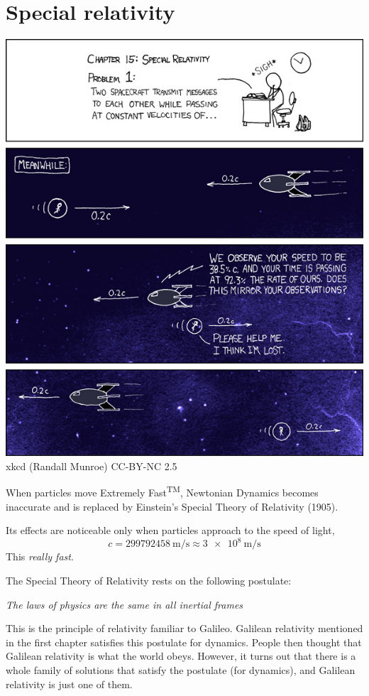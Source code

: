 \documentclass[a4paper]{article}
\begin{document}
\section{Special relativity}
\begin{center}
  \includegraphics[scale=4]{images/xkcd_choices_part_2.jpg}\\
  xkcd (Randall Munroe) CC-BY-NC 2.5
\end{center}
When particles move Extremely Fast\textsuperscript{TM}, Newtonian Dynamics becomes inaccurate and is replaced by Einstein's Special Theory of Relativity (1905).

Its effects are noticeable only when particles approach to the speed of light,
\[
  c = \SI{299792458}{\meter\per\second} \approx \SI{3e8}{\meter\per\second}
\]
This \emph{really fast}.

The Special Theory of Relativity rests on the following postulate:

\begin{center}
  \emph{The laws of physics are the same in all inertial frames}
\end{center}

This is the principle of relativity familiar to Galileo. Galilean relativity mentioned in the first chapter satisfies this postulate for dynamics. People then thought that Galilean relativity is what the world obeys. However, it turns out that there is a whole family of solutions that satisfy the postulate (for dynamics), and Galilean relativity is just one of them.
\end{document}
